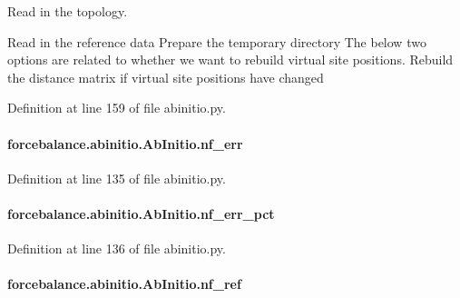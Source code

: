 Read in the topology. 

Read in the reference data Prepare the temporary directory The below two options are related to whether we want to rebuild virtual site positions. Rebuild the distance matrix if virtual site positions have changed 

Definition at line 159 of file abinitio.\-py.

\hypertarget{classforcebalance_1_1abinitio_1_1AbInitio_a89de620e9aa500481c9e1ded99e14f72}{
\paragraph[{nf\-\_\-err}]{\setlength{\rightskip}{0pt plus 5cm}forcebalance.\-abinitio.\-Ab\-Initio.\-nf\-\_\-err\hspace{0.3cm}{\ttfamily [inherited]}}}\label{classforcebalance_1_1abinitio_1_1AbInitio_a89de620e9aa500481c9e1ded99e14f72}


Definition at line 135 of file abinitio.\-py.

\hypertarget{classforcebalance_1_1abinitio_1_1AbInitio_a184edac2cb27a999c363595ea59d8163}{
\paragraph[{nf\-\_\-err\-\_\-pct}]{\setlength{\rightskip}{0pt plus 5cm}forcebalance.\-abinitio.\-Ab\-Initio.\-nf\-\_\-err\-\_\-pct\hspace{0.3cm}{\ttfamily [inherited]}}}\label{classforcebalance_1_1abinitio_1_1AbInitio_a184edac2cb27a999c363595ea59d8163}


Definition at line 136 of file abinitio.\-py.

\hypertarget{classforcebalance_1_1abinitio_1_1AbInitio_a5a77f4b99a5b01245ab0435d632122a1}{
\paragraph[{nf\-\_\-ref}]{\setlength{\rightskip}{0pt plus 5cm}forcebalance.\-abinitio.\-Ab\-Initio.\-nf\-\_\-ref\hspace{0.3cm}{\ttfamily [inherited]}}}\label{classforcebalance_1_1abinitio_1_1AbInitio_a5a77f4b99a5b01245ab0435d632122a1}



